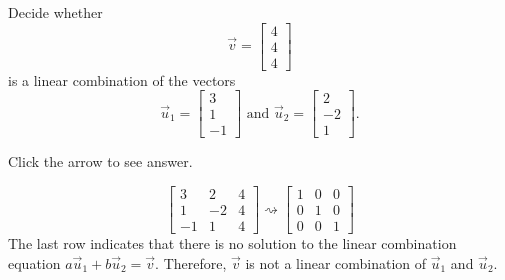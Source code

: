 \documentclass{ximera}
\begin{document}
\begin{problem}\label{prb:3.4}
Decide whether
$$
\vec{v}= 
\begin{bmatrix}
4 \\
4 \\
4
\end{bmatrix}
$$
is a linear combination of the vectors
$$
\vec{u}_1 = 
\begin{bmatrix}
3 \\
1 \\
-1
\end{bmatrix}
\mbox{ and  }
\vec{u}_2 =
\begin{bmatrix}
2 \\
-2\\
1
\end{bmatrix}.
$$

Click the arrow to see answer.

\begin{expandable}
$$\left[
\begin{array}{rr|r}
3 & 2 & 4 \\
1 & -2 & 4\\
-1 & 1 & 4
\end{array}
\right] \rightsquigarrow \left[
\begin{array}{rr|r}1& 0& 0\\
 0& 1 & 0\\
 0& 0& 1\end{array}
\right]$$
The last row indicates that there is no solution to the linear combination equation $a\vec{u}_1+b\vec{u}_2=\vec{v}$.  Therefore, $\vec{v}$ is not a linear combination of $\vec{u}_1$ and $\vec{u}_2$.
\end{expandable}
\end{problem}
\end{document}

